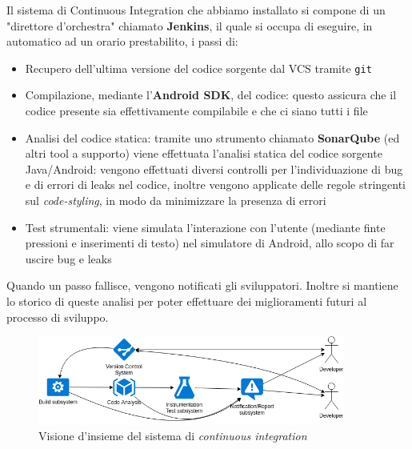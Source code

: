 \documentclass[a4paper,10pt]{memoir}
\begin{document}
Il sistema di Continuous Integration che abbiamo installato si compone di un "direttore d'orchestra" chiamato \textbf{Jenkins}, il quale si occupa di eseguire, in automatico ad un orario prestabilito, i passi di:
\begin{itemize}
\item Recupero dell'ultima versione del codice sorgente dal VCS tramite \texttt{git}
\item Compilazione, mediante l'\textbf{Android SDK}, del codice: questo assicura che il codice presente sia effettivamente compilabile e che ci siano tutti i file
\item Analisi del codice statica: tramite uno strumento chiamato \textbf{SonarQube} (ed altri tool a supporto) viene effettuata l'analisi statica del codice sorgente Java/Android: vengono effettuati diversi controlli per l'individuazione di bug e di errori di leaks nel codice, inoltre vengono applicate delle regole stringenti sul \textit{code-styling}, in modo da minimizzare la presenza di errori
\item Test strumentali: viene simulata l'interazione con l'utente (mediante finte pressioni e inserimenti di testo) nel simulatore di Android, allo scopo di far uscire bug e leaks
\end{itemize}

Quando un passo fallisce, vengono notificati gli sviluppatori. Inoltre si mantiene lo storico di queste analisi per poter effettuare dei miglioramenti futuri al processo di sviluppo.

\begin{figure}[ht]
\centering
\includegraphics[width=0.9\textwidth]{dev/ci}
\caption{Visione d'insieme del sistema di \textit{continuous integration}}
\end{figure}

\clearpage
\end{document}
